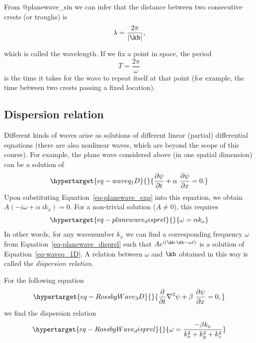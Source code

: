 \documentclass[
  letterpaper,
  twocolumn,
  landscape]{report}
\begin{document}
From @planewave\_sin we can infer that the distance between two
consecutive crests (or troughs) is \[
    \lambda = \frac{2\pi}{|\kb|},
\]

which is called the wavelength. If we fix a point in space, the period
\[
    T = \frac{2\pi}{\omega}
\] is the time it takes for the wave to repeat itself at that point (for
example, the time between two crests passing a fixed location).

\hypertarget{dispersion-relation}{%
\subsection{Dispersion relation}\label{dispersion-relation}}

Different kinds of waves arise as solutions of different linear
(partial) differential equations (there are also nonlinear waves, which
are beyond the scope of this course). For example, the plane wave
considered above (in one spatial dimension) can be a solution of
\begin{equation}\protect\hypertarget{eq-waveq_1D}{}{
    \frac{\partial \psi}{\partial t} + \alpha \ \frac{\partial \psi}{\partial x} = 0.
}\label{eq-waveq_1D}\end{equation} Upon substituting
Equation~\ref{eq-planewave_exp} into this equation, we obtain
\(A(-i\omega + \alpha \ ik_x)=0\). For a non-trivial solution
(\(A \neq 0\)), this requires
\begin{equation}\protect\hypertarget{eq-planewave_disprel}{}{  \omega = \alpha k_x }\label{eq-planewave_disprel}\end{equation}
In other words, for any wavenumber \(k_x\) we can find a corresponding
frequency \(\omega\) from Equation~\ref{eq-planewave_disprel} such that
\(A e^{i (\kb \cdot \xb - \omega t)}\) is a solution of
Equation~\ref{eq-waveq_1D}. A relation between \(\omega\) and \(\kb\)
obtained in this way is called the \emph{dispersion relation}.

\begin{tcolorbox}[enhanced jigsaw, left=2mm, opacityback=0, coltitle=black, bottomtitle=1mm, title={Example}, toprule=.15mm, colbacktitle=quarto-callout-tip-color!10!white, breakable, arc=.35mm, titlerule=0mm, colback=white, toptitle=1mm, opacitybacktitle=0.6, rightrule=.15mm, bottomrule=.15mm, colframe=quarto-callout-tip-color-frame, leftrule=.75mm]

For the following equation
\begin{equation}\protect\hypertarget{eq-RossbyWave_3D}{}{
    \frac{\partial}{\partial t} \nabla^2 \psi + \beta \ \frac{\partial \psi}{\partial x} = 0,
}\label{eq-RossbyWave_3D}\end{equation} we find the dispersion relation
\begin{equation}\protect\hypertarget{eq-RossbyWave_disprel}{}{
    \omega = \frac{-\beta k_x}{k_x^2+k_y^2+k_z^2}
}\label{eq-RossbyWave_disprel}\end{equation}

\end{tcolorbox}
\end{document}
